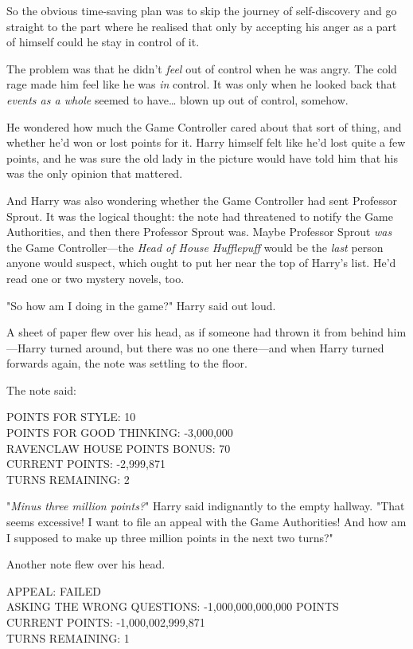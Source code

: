 So the obvious time-saving plan was to skip the journey of self-discovery and 
go straight to the part where he realised that only by accepting his anger as a 
part of himself could he stay in control of it.

The problem was that he didn't \emph{feel} out of control when he was angry. 
The cold rage made him feel like he was \emph{in} control. It was only when he 
looked back that \emph{events as a whole} seemed to have{\ldots} blown up out 
of control, somehow.

He wondered how much the Game Controller cared about that sort of thing, and 
whether he'd won or lost points for it. Harry himself felt like he'd lost quite 
a few points, and he was sure the old lady in the picture would have told him 
that his was the only opinion that mattered.

And Harry was also wondering whether the Game Controller had sent Professor 
Sprout. It was the logical thought: the note had threatened to notify the Game 
Authorities, and then there Professor Sprout was. Maybe Professor Sprout 
\emph{was} the Game Controller---the\emph{ Head of House Hufflepuff} would be 
the \emph{last} person anyone would suspect, which ought to put her near the 
top of Harry's list. He'd read one or two mystery novels, too.

"So how am I doing in the game?" Harry said out loud.

A sheet of paper flew over his head, as if someone had thrown it from behind 
him---Harry turned around, but there was no one there---and when Harry turned 
forwards again, the note was settling to the floor.

The note said:

POINTS FOR STYLE: 10\\
POINTS FOR GOOD THINKING: -3,000,000\\
RAVENCLAW HOUSE POINTS BONUS: 70\\
CURRENT POINTS: -2,999,871\\
TURNS REMAINING: 2

"\emph{Minus three million points?}" Harry said indignantly to the empty 
hallway. "That seems excessive! I want to file an appeal with the Game 
Authorities! And how am I supposed to make up three million points in the next 
two turns?"

Another note flew over his head.

APPEAL: FAILED\\
ASKING THE WRONG QUESTIONS: -1,000,000,000,000 POINTS\\
CURRENT POINTS: -1,000,002,999,871\\
TURNS REMAINING: 1

